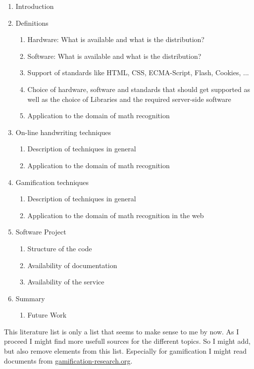 \documentclass[a4paper]{scrartcl}
\begin{document}
\begin{enumerate}
    \item Introduction
    \item Definitions
    \begin{enumerate}
        \item Hardware: What is available and what is the distribution?
        \item Software: What is available and what is the distribution?
        \item Support of standards like HTML, CSS, ECMA-Script, Flash, Cookies, ...
        \item Choice of hardware, software and standards that should get supported as well as the choice of Libraries and the required server-side software
        \item Application to the domain of math recognition
    \end{enumerate}
    \item On-line handwriting techniques
    \begin{enumerate}
        \item Description of techniques in general
        \item Application to the domain of math recognition
    \end{enumerate}
    \item Gamification techniques
    \begin{enumerate}
        \item Description of techniques in general
        \item Application to the domain of math recognition in the web
    \end{enumerate}
    \item Software Project
    \begin{enumerate}
        \item Structure of the code
        \item Availability of documentation
        \item Availability of the service
    \end{enumerate}
    \item Summary
    \begin{enumerate}
        \item Future Work
    \end{enumerate}
\end{enumerate}
\break

\renewcommand\refname{Related Literature}
\nocite{*}



This literature list is only a list that seems to make sense to me
by now. As I proceed I might find more usefull sources for the different
topics. So I might add, but also remove elements from this list.
Especially for gamification I might read documents from
\href{http://gamification-research.org/}{gamification-research.org}.
\end{document}
